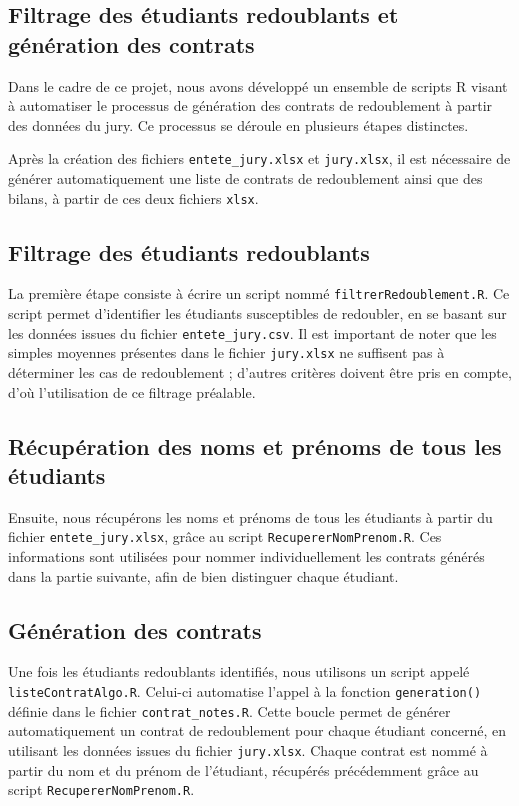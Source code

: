 \subsection{Filtrage des étudiants redoublants et génération des contrats}

Dans le cadre de ce projet, nous avons développé un ensemble de scripts R visant à automatiser le processus de génération des contrats de redoublement à partir des données du jury. Ce processus se déroule en plusieurs étapes distinctes.

Après la création des fichiers \texttt{entete\_jury.xlsx} et \texttt{jury.xlsx}, il est nécessaire de générer automatiquement une liste de contrats de redoublement ainsi que des bilans, à partir de ces deux fichiers \texttt{xlsx}.

\subsection{Filtrage des étudiants redoublants}

La première étape consiste à écrire un script nommé \texttt{filtrerRedoublement.R}. Ce script permet d’identifier les étudiants susceptibles de redoubler, en se basant sur les données issues du fichier \texttt{entete\_jury.csv}. Il est important de noter que les simples moyennes présentes dans le fichier \texttt{jury.xlsx} ne suffisent pas à déterminer les cas de redoublement ; d’autres critères doivent être pris en compte, d’où l’utilisation de ce filtrage préalable.

\subsection{Récupération des noms et prénoms de tous les étudiants}

Ensuite, nous récupérons les noms et prénoms de tous les étudiants à partir du fichier \texttt{entete\_jury.xlsx}, grâce au script \texttt{RecupererNomPrenom.R}. Ces informations sont utilisées pour nommer individuellement les contrats générés dans la partie suivante, afin de bien distinguer chaque étudiant.

\subsection{Génération des contrats}

Une fois les étudiants redoublants identifiés, nous utilisons un script appelé \texttt{listeContratAlgo.R}. Celui-ci automatise l’appel à la fonction \texttt{generation()} définie dans le fichier \texttt{contrat\_notes.R}. Cette boucle permet de générer automatiquement un contrat de redoublement pour chaque étudiant concerné, en utilisant les données issues du fichier \texttt{jury.xlsx}. Chaque contrat est nommé à partir du nom et du prénom de l’étudiant, récupérés précédemment grâce au script \texttt{RecupererNomPrenom.R}.

